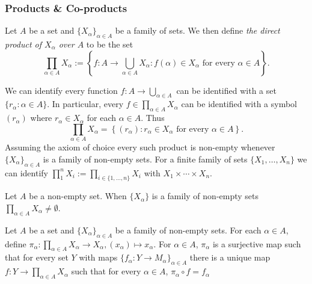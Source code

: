 \subsubsection{Products \& Co-products}
\begin{definition}
    Let $A$ be a set and $\{X_\alpha\}_{\alpha\in A}$ be a family of sets. We then define \textit{the direct product of $X_\alpha$ over $A$} to be the set
    $$\prod_{\alpha\in A} X_\alpha := \left\{ f: A \rightarrow \bigcup_{\alpha \in A} X_\alpha : f(\alpha) \in X_\alpha \text{ for every } \alpha\in A\right\}.$$
\end{definition}
\begin{remark}
    We can identify every function $f : A \rightarrow \bigcup_{\alpha\in A}$ can be identified with a set $\{r_\alpha : \alpha\in A\}$. In particular, every $f\in \prod_{\alpha\in A} X_\alpha$ can be identified with a symbol $(r_\alpha)$ where $r_\alpha\in X_\alpha$ for each $\alpha\in A$. Thus 
    $$\prod_{\alpha\in A} X_\alpha = \left\{ (r_\alpha) : r_\alpha\in X_\alpha \text{ for every } \alpha\in A\right\}.$$
    Assuming the axiom of choice every such product is non-empty whenever $\{X_\alpha\}_{\alpha\in A}$ is a family of non-empty sets. For a finite family of sets $\{X_1,\dots,X_n\}$ we can identify $\prod_1^n X_i := \prod_{i\in \{1,\dots,n\}} X_i$ with $X_1\times \cdots \times X_n$.  
\end{remark}
\begin{axioms}
    Let $A$ be a non-empty set. When $\{X_\alpha\}$ is a family of non-empty sets $\prod_{\alpha \in A} X_\alpha \neq \emptyset$. 
\end{axioms}
\begin{proposition}\label{DirectProductIsADirectProductInTheCategoryOfSets}
    Let $A$ be a set and $\{X_\alpha\}_{\alpha\in A}$ be a family of non-empty sets. For each $\alpha\in A$, define $\pi_\alpha : \prod_{\alpha\in A} X_\alpha \rightarrow X_\alpha, (x_\alpha)\mapsto x_\alpha$. For $\alpha\in A$, $\pi_\alpha$ is a surjective map such that for every set $Y$ with maps $\{f_\alpha : Y \rightarrow M_\alpha\}_{\alpha\in A} $ there is a unique map $f : Y \rightarrow \prod_{\alpha \in A} X_\alpha$ such that for every $\alpha \in A$, $\pi_\alpha \circ f = f_\alpha$   
\end{proposition}
